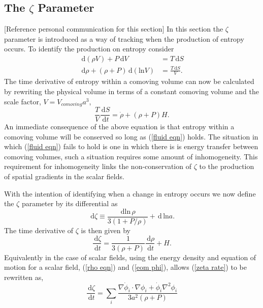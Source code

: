 \documentclass[letterpaper,11pt]{article}
\newcommand{\ud}{\,\mathrm{d}}
\begin{document}
\subsection{The $\zeta$ Parameter}
[Reference personal communication for this section]
In this section the $\zeta$ parameter is introduced as a way of tracking when the production of entropy occurs. To identify the production on entropy consider 
\begin{align}
\ud (\rho V) + P\ud V &= T \ud S \\
\ud \rho + (\rho + P)\ud(\mathrm{ln}V) &= \frac{T\ud S}{V}.
\end{align}
The time derivative of entropy within a comoving volume can now be calculated by rewriting the physical volume in terms of a constant comoving volume and the scale factor, $V=V_{comoving}a^3$,
\begin{equation}
\frac{T}{V}\frac{\ud S}{\ud t} = \dot{\rho} + (\rho + P)H. \label{S rate}
\end{equation}
An immediate consequence of the above equation is that entropy within a comoving volume will be conserved so long as (\ref{fluid eqn}) holds. The situation in which (\ref{fluid eqn}) fails to hold is one in which there is is energy transfer between comoving volumes, such a situation requires some amount of inhomogeneity. This requirement for inhomogeneity links the non-conservation of $\zeta$ to the production of spatial gradients in the scalar fields.

With the intention of identifying when a change in entropy occurs we now define the $\zeta$ parameter by its differential as
\begin{equation}
\ud \zeta \equiv \frac{\ud \mathrm{ln}\,\rho}{3(1+P/\rho)} + \ud\, \mathrm{ln} a.
\end{equation}
The time derivative of $\zeta$ is then given by
\begin{equation}
\frac{\ud \zeta}{\ud t} = \frac{1}{3(\rho + P)}\frac{\ud \rho}{\ud t} + H. \label{zeta rate}
\end{equation}
Equivalently in the case of scalar fields, using the energy density and equation of motion for a scalar field, (\ref{rho eqn}) and (\ref{eom phi}), allows (\ref{zeta rate}) to be rewritten as,
\begin{equation}
\frac{\ud \zeta}{\ud t} = \sum_i \frac{\nabla \dot{\phi}_i \cdot \nabla \phi_i + \dot{\phi}_i\nabla^2\phi_i}{3a^2(\rho + P)}
\end{equation}
\end{document}
